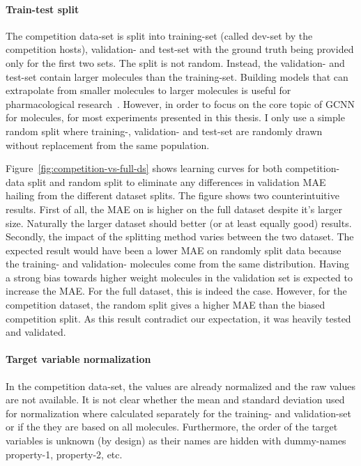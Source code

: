 \paragraph{Train-test split}
The competition data-set is split into training-set (called dev-set by the competition hosts), validation- and test-set with the ground truth being provided only for the first two sets. The split is not random. Instead, the validation- and test-set contain larger molecules than the training-set. Building models that can extrapolate from smaller molecules to larger molecules is useful for pharmacological research~\cite{Chen2019}. However, in order to focus on the core topic of GCNN for molecules, for most experiments presented in this thesis. I only use a simple random split where training-, validation- and test-set are randomly drawn without replacement from the same population.

Figure~\ref{fig:competition-vs-full-ds} shows learning curves for both competition-data split and random split to eliminate any differences in validation MAE hailing from the different dataset splits.
The figure shows two counterintuitive results. First of all, the MAE on is higher on the full dataset despite it's larger size. Naturally the larger dataset should better (or at least equally good) results. Secondly, the impact of the splitting method varies between the two dataset. The expected result would have been a lower MAE on randomly split data because the training- and validation- molecules come from the same distribution. Having a strong bias towards higher weight molecules in the validation set is expected to increase the MAE. For the full dataset, this is indeed the case. However, for the competition dataset, the random split gives a higher MAE than the biased competition split. As this result contradict our expectation, it was heavily tested and validated.



\paragraph{Target variable normalization}

In the competition data-set, the values are already normalized and the raw values are not available. It is not clear whether the mean and standard deviation used for normalization where calculated separately for the training- and validation-set or if the they are based on all molecules. Furthermore, the order of the target variables is unknown (by design) as their names are hidden with dummy-names property-1, property-2, etc.

